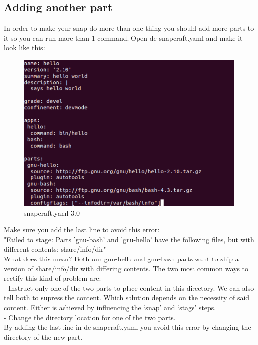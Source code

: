 \documentclass{article}
\begin{document}
\begin{flushleft}
\subsection{Adding another part}\label{sec:adding another part}
\begin{flushleft}
In order to make your snap do more than one thing you should add more parts to it so you can run more than 1 command. Open de snapcraft.yaml and make it look like this: 
\label{fig:step10}	
	\begin{figure}[H]
	\includegraphics[width=5in]{step10.png}
	\caption[Optional caption]{snapcraft.yaml 3.0}
	\end{figure}
Make sure you add the last line to avoid this error: \\
"Failed to stage: Parts 'gnu-bash' and 'gnu-hello' have the following files, but with different contents:
    share/info/dir"\\
    What does this mean? Both our gnu-hello and gnu-bash parts want to ship a version of
share/info/dir with differing contents. The two most common ways to rectify this kind of problem
are:\\

\bigskip
- Instruct only one of the two parts to place content in this directory. We can also tell both
to supress the content. Which solution depends on the necessity of said content. Either is
achieved by influencing the ‘snap' and ‘stage' steps.\\
- Change the directory location for one of the two parts.\\
\bigskip
By adding the last line in de snapcraft.yaml you avoid this error by changing the directory of the new part.
\cleardoublepage


\end{flushleft}
\end{flushleft}
\end{document}
